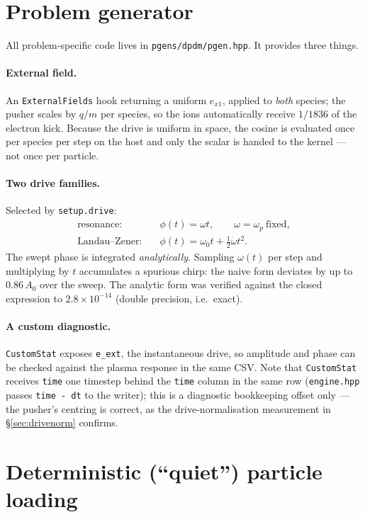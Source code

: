 \documentclass[11pt,a4paper]{article}
\newcommand{\code}[1]{\texttt{\small #1}}
\begin{document}
\section{Problem generator}
\label{sec:pgen}

All problem-specific code lives in \code{pgens/dpdm/pgen.hpp}. It provides three
things.

\paragraph{External field.} An \code{ExternalFields} hook returning a uniform
$e_{x1}$, applied to \emph{both} species; the pusher scales by $q/m$ per species, so
the ions automatically receive $1/1836$ of the electron kick. Because the drive is
uniform in space, the cosine is evaluated once per species per step on the host and
only the scalar is handed to the kernel --- not once per particle.

\paragraph{Two drive families.} Selected by \code{setup.drive}:
\begin{align}
  \text{resonance:}\quad & \phi(t) = \omega t, \qquad \omega = \omega_p
  \ \text{fixed},\\
  \text{Landau--Zener:}\quad & \phi(t) = \omega_0 t + \tfrac12 \dot\omega t^2 .
\end{align}
The swept phase is integrated \emph{analytically}. Sampling $\omega(t)$ per step and
multiplying by $t$ accumulates a spurious chirp: the naive form deviates by up to
$0.86\,A_0$ over the sweep. The analytic form was verified against the closed
expression to $2.8\times10^{-14}$ (double precision, i.e.\ exact).

\paragraph{A custom diagnostic.} \code{CustomStat} exposes \code{e\_ext}, the
instantaneous drive, so amplitude and phase can be checked against the plasma response
in the same CSV. Note that \code{CustomStat} receives \code{time} one timestep behind
the \code{time} column in the same row (\code{engine.hpp} passes \code{time - dt} to
the writer); this is a diagnostic bookkeeping offset only --- the pusher's centring is
correct, as the drive-normalisation measurement in \S\ref{sec:drivenorm} confirms.

\section{Deterministic (``quiet'') particle loading}
\label{sec:quiet}
\end{document}
